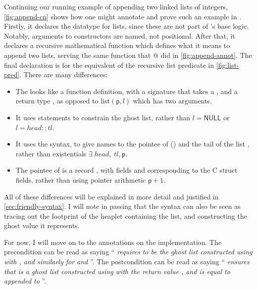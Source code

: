 Continuing our running example of appending two linked lists of
integers, \cref{fig:append-cn} shows how one might annotate and prove such an
example in . Firstly, it declares the datatype for  lists,
since these are not part of 's base logic. Notably, arguments to
constructors are named, not positional. After that, it declares a recursive
\cninline{[rec]} mathematical function  which defines what
it means to append two lists, serving the same function that $@$ did in
\cref{fig:append-annot}. The final  declaration is for the equivalent of
the recursive list predicate in \cref{fig:list-pred}. There are many
differences:
\begin{itemize}
    \item The   looks like a function definition,
        with a signature that takes a , and a
        return type , as opposed to
        $\mathrm{list}(\mathsf{p}, l)$ which has two arguments.
    \item It uses  statements to constrain the ghost list,
        rather than $l = \mathsf{NULL}$ or $l = {head}{:}{:}{tl}$.
    \item It uses the  syntax, to give names to the pointee of
         () and the tail of the list ,
        rather than existentials $\exists{} \; {head}, \; {tl}, \mathsf{p}$.
    \item The pointee of  is a record , with fields
         and  corresponding to the C struct
        fields, rather than using pointer arithmetic $\mathsf{p} + 1$.
\end{itemize}

All of these differences will be explained in more detail and justified in
\cref{sec:friendly-syntax}. I will note in passing that the syntax can also be
seen as tracing out the footprint of the heaplet containing the list, and
constructing the ghost value it represents.

For now, I will move on to the annotations on the implementation. The
precondition can be read as saying ``\emph{ requires
 to be the ghost list constructed using 
with , and similarly for  and }''. The
postcondition can be read as saying ``\emph{ ensures that
 is a ghost list constructed using  with the
return value , and  is equal to 
appended to }''.

